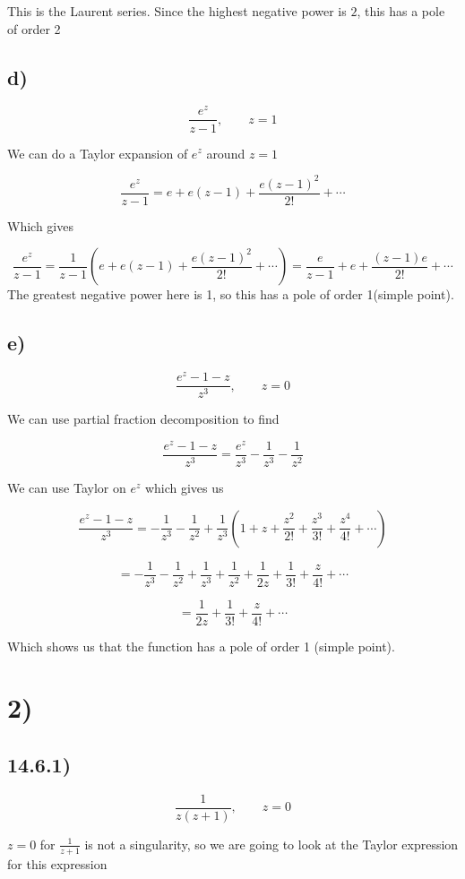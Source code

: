 \documentclass[a4paper,norsk, 10pt]{article}
\begin{document}
This is the Laurent series. Since the highest negative power is $2$, this has a pole of order 2

\subsection*{d)}
$$
\frac{e^z}{z-1},\qquad z = 1
$$

We can do a Taylor expansion of $e^z$ around $z=1$

$$
\frac{e^z}{z-1} = e +e(z-1) + \frac{e(z-1)^2}{2!}+\cdots
$$

Which gives

$$
\frac{e^z}{z-1} = \frac{1}{z-1}\left(e +e(z-1) + \frac{e(z-1)^2}{2!}+\cdots\right) = \frac{e}{z-1} + e + \frac{(z-1)e}{2!} + \cdots
$$
The greatest negative power here is 1, so this has a pole of order 1(simple point).

\subsection*{e)}
$$
\frac{e^z - 1- z}{z^3},\qquad z = 0
$$

We can use partial fraction decomposition to find

$$
\frac{e^z - 1- z}{z^3} = \frac{e^z}{z^3} - \frac{1}{z^3} - \frac{1}{z^2}
$$

We can use Taylor on $e^z$ which gives us

$$
\frac{e^z - 1- z}{z^3} = - \frac{1}{z^3} - \frac{1}{z^2} + \frac{1}{z^3}\left(1+z+\frac{z^2}{2!}+\frac{z^3}{3!}+\frac{z^4}{4!} + \cdots\right)
$$

$$
= - \frac{1}{z^3} - \frac{1}{z^2} + \frac{1}{z^3} + \frac{1}{z^2} + \frac{1}{2z} + \frac{1}{3!} + \frac{z}{4!} + \cdots
$$

$$
=\frac{1}{2z} + \frac{1}{3!} + \frac{z}{4!} + \cdots
$$

Which shows us that the function has a pole of order 1 (simple point).
\newpage
\section*{2)}
\subsection*{14.6.1)}

$$
\frac{1}{z(z+1)}, \qquad z = 0
$$

$z = 0$ for $\frac{1}{z+1}$ is not a singularity, so we are going to look at the Taylor expression for this expression
\end{document}
